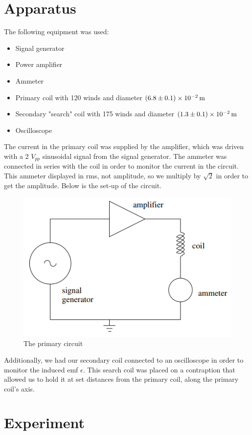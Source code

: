 \documentclass[12pt]{article}
\numberwithin{equation}{section}
\numberwithin{figure}{section}
\begin{document}
    \section{Apparatus}
    The following equipment was used:
    \begin{itemize}
        \item Signal generator
        \item Power amplifier
        \item Ammeter
        \item Primary coil with 120 winds and diameter $\SI{6.8\pm0.1e-2}{\metre}$
        \item Secondary "search" coil with 175 winds and diameter $\SI{1.3\pm0.1e-2}{\metre}$
        \item Oscilloscope
    \end{itemize}
    The current in the primary coil was supplied by the amplifier, which was driven with a
    2 $V_{pp}$ sinusoidal signal from the signal generator. The ammeter was connected in 
    series with the coil in order to monitor the current in the circuit. This ammeter 
    displayed in rms, not amplitude, so we multiply by $\sqrt 2$ in order to get the 
    amplitude. Below is the set-up of the circuit.
    \begin{figure}[H]
        \begin{center}
           \includegraphics[width=.65\textwidth]{PrimaryCircuit.png}
           \caption{The primary circuit}
           \label{fig:PrimaryCircuitDiagram}
        \end{center}
    \end{figure}
    Additionally, we had our secondary coil connected to an oscilloscope in order to monitor 
    the induced emf $\epsilon$. This search coil was placed on a contraption that allowed us 
    to hold it at set distances from the primary coil, along the primary coil's axis. 

    \section{Experiment}
\end{document}
